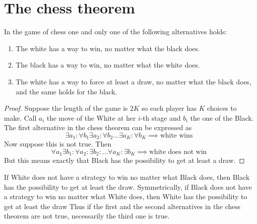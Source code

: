 \section{The chess theorem}

\begin{theorem}
    In the game of chess one and only one of the following alternatives holds:
    \begin{enumerate}
        \item The white has a way to win, no matter what the black does.
        \item The black has a way to win, no matter what the white does.
        \item The white has a way to force at least a draw, no matter what the black does, and the same holds for the black.
    \end{enumerate}
\end{theorem}
\begin{proof}
    Suppose the length of the game is $2K$ so each player has $K$ choices to make.
    Call $a_i$ the move of the White at her $i$-th stage and $b_i$ the one of the Black. 
    The first alternative in the chess theorem can be expressed as
    \[\exists a_1 : \forall b_1 \exists a_2 : \forall b_2 \dots \exists a_K : \forall b_K \implies \text{white wins}\]
    Now suppose this is not true. Then
    \[\forall a_1 \exists b_1 : \forall a_2 : \exists b_2 : \dots \forall a_K : \exists b_K \implies \text{white does not win}\]
    But this means exactly that Black has the possibility to get at least a draw.
\end{proof}
If White does not have a strategy to win no matter what Black does, then Black has the possibility to get at least the draw.
Symmetrically, if Black does not have a strategy to win no matter what White does, then White has the possibility to get at least the draw
Thus if the first and the second alternatives in the chess theorem are not true, necessarily the third one is true. 


